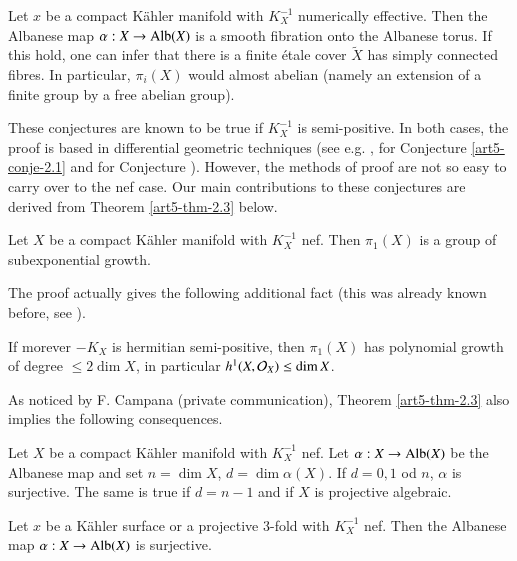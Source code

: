 \begin{conjecture}\label{art5-conje-2.2}
Let $x$ be a compact K\"ahler manifold with $K_{X}^{-1}$ numerically effective. Then the Albanese map $\alpha : X\rightarrow \operatorname{Alb}(X)$ is a smooth fibration onto the Albanese torus. If this hold, one can infer that there is a finite
\'etale cover $\widetilde{X}$ has simply connected fibres. In particular, $\pi_{i}(X)$ would almost abelian (namely an extension of a finite group by a free abelian group).

These conjectures are known to be true if $K_{X}^{-1}$ is semi-positive. In both cases, the proof is based in differential geometric techniques (see e.g. \cite{art5-keyBi63}, \cite{art5-keyHK75} for Conjecture \ref{art5-conje-2.1} and \cite{art5-keyLi71} for Conjecture \cite{art5-conje-2.2}). However, the methods of proof are not so easy to carry over to the nef case. Our main contributions to these conjectures are derived from Theorem \ref{art5-thm-2.3} below.
\end{conjecture}

\begin{theorem}\label{art5-thm-2.3}
Let $X$ be a compact K\"ahler manifold with $K_{X}^{-1}$ nef. Then $\pi_{1}(X)$ is a group of subexponential growth.
\end{theorem}

The proof actually gives the following additional fact (this was already known before, see \cite{Bi63}).

\begin{coro}\label{art5-coro-2.4}
If morever $-K_{X}$ is hermitian semi-positive, then $\pi_{1}(X)$ has polynomial growth of degree $\leq 2 \dim X$, in particular $h^{1}(X, \mathcal{O}_{X}) \leq \dim X$.
\end{coro}

As noticed by F. Campana (private communication), Theorem \ref{art5-thm-2.3} also implies the following consequences. 

\begin{coro}\label{art5-coro-2.5}
Let $X$ be a compact K\"ahler manifold with $K_{X}^{-1}$ nef. Let $\alpha : X\rightarrow \operatorname{Alb}(X)$ be the Albanese map and set $n=\dim X$, $d=\dim \alpha(X)$. If $d=0, 1$ od $n$, $\alpha$ is surjective. The same is true if $d = n-1$ and if $X$ is projective algebraic. 
\end{coro}

\begin{coro}\label{art5-coro-2.6}
Let $x$ be a K\"ahler surface or a projective 3-fold with $K_{X}^{-1}$ nef. Then the Albanese map $\alpha : X\rightarrow \operatorname{Alb}(X)$ is surjective.
\end{coro}

